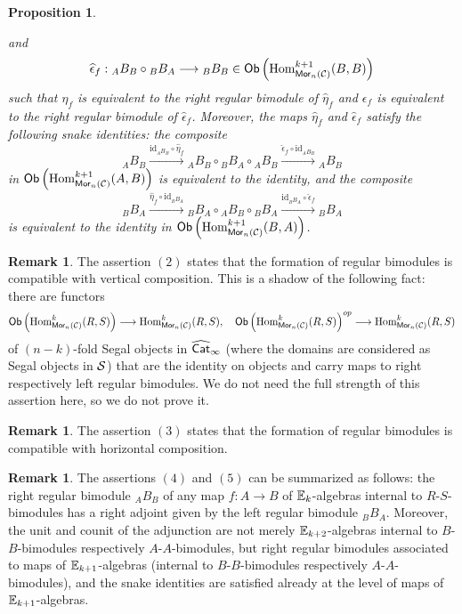 \documentclass[10pt, reqno, twoside
, final
]{amsart}
\numberwithin{equation}{subsection}%
\theoremstyle{definition}
\theoremstyle{definition}
\theoremstyle{definition}
\theoremstyle{definition}
\theoremstyle{definition}
\theoremstyle{definition}
\theoremstyle{definition}
\theoremstyle{definition}
\theoremstyle{definition}
\theoremstyle{plain}
\theoremstyle{definition}
\theoremstyle{plain}
\theoremstyle{definition}
\theoremstyle{plain}
\theoremstyle{definition}
\newtheorem{rmk}[defn]{Remark}
\theoremstyle{definition}
\theoremstyle{plain}
\theoremstyle{plain}
\theoremstyle{definition}
\theoremstyle{plain}
\theoremstyle{plain}
\newtheorem{prop}[defn]{Proposition}
\theoremstyle{plain}
\begin{document}
\begin{prop}
\begin{enumerate}[$(1)$]
    and
    \[\widehat{\epsilon}_{f}:{}_AB_B\circ {}_BB_{A}\longrightarrow {}_BB_B\in\mathsf{Ob}\left(\mathrm{Hom}^{k+1}_{\mathsf{Mor}_n(\mathcal{C})}(B,B)\right) \] 
    such that $\eta_f$ is equivalent to the right regular bimodule of $\widehat{\eta}_f$ and $\epsilon_f$ is equivalent to the right regular bimodule of $\widehat{\epsilon}_f$. Moreover, the maps $\widehat{\eta}_f$ and $\widehat{\epsilon}_{f}$ satisfy the following snake identities: the composite
    \[  {}_AB_B \xrightarrow{\mathrm{id}_{{}_AB_B}\circ\widehat{\eta}_f}  {}_AB_B\circ {}_BB_A\circ  {}_AB_B  \xrightarrow{\widehat{\epsilon}_f\circ\mathrm{id}_{{}_AB_B}} {}_AB_B  \]
    in $\mathsf{Ob}\left(\mathrm{Hom}^{k+1}_{\mathsf{Mor}_n(\mathcal{C})}(A,B)\right)$ is equivalent to the identity, and the composite 
    \[  {}_BB_A \xrightarrow{\widehat{\eta}_f\circ \mathrm{id}_{{}_BB_A}}  {}_BB_A\circ {}_AB_B\circ  {}_BB_A  \xrightarrow{\mathrm{id}_{{}_BB_A}\circ\widehat{\epsilon}_f} {}_BB_A  \]
    is equivalent to the identity in $\mathsf{Ob}\left(\mathrm{Hom}^{k+1}_{\mathsf{Mor}_n(\mathcal{C})}(B,A)\right)$. 
\end{enumerate}
\end{prop}
\begin{rmk}\label{rmk:regularbimodfunctor}
The assertion $(2)$ states that the formation of regular bimodules is compatible with vertical composition. This is a shadow of the following fact: there are functors
\[ \mathsf{Ob}\left(\mathrm{Hom}^k_{\mathsf{Mor}_n(\mathcal{C})}(R,S)\right)\longrightarrow  \mathrm{Hom}^k_{\mathsf{Mor}_n(\mathcal{C})}(R,S),\quad   \mathsf{Ob}\left(\mathrm{Hom}^k_{\mathsf{Mor}_n(\mathcal{C})}(R,S)\right)^{op}\longrightarrow  \mathrm{Hom}^k_{\mathsf{Mor}_n(\mathcal{C})}(R,S)\]
of $(n-k)$-fold Segal objects in $\widehat{\mathsf{Cat}}_{\infty}$ (where the domains are considered as Segal objects in $\mathcal{S}$) that are the identity on objects and carry maps to right respectively left regular bimodules. We do not need the full strength of this assertion here, so we do not prove it.
\end{rmk}
\begin{rmk}
The assertion $(3)$ states that the formation of regular bimodules is compatible with horizontal composition.     
\end{rmk}
\begin{rmk}
The assertions $(4)$ and $(5)$ can be summarized as follows: the right regular bimodule ${}_AB_B$ of any map $f:A\rightarrow B$ of $\mathbb{E}_k$-algebras internal to $R$-$S$-bimodules has a right adjoint given by the left regular bimodule ${}_BB_A$. Moreover, the unit and counit of the adjunction are not merely $\mathbb{E}_{k+2}$-algebras internal to $B$-$B$-bimodules respectively $A$-$A$-bimodules, but right regular bimodules associated to maps of $\mathbb{E}_{k+1}$-algebras (internal to $B$-$B$-bimodules respectively $A$-$A$-bimodules), and the snake identities are satisfied already at the level of maps of $\mathbb{E}_{k+1}$-algebras.
\end{rmk}
\end{document}
